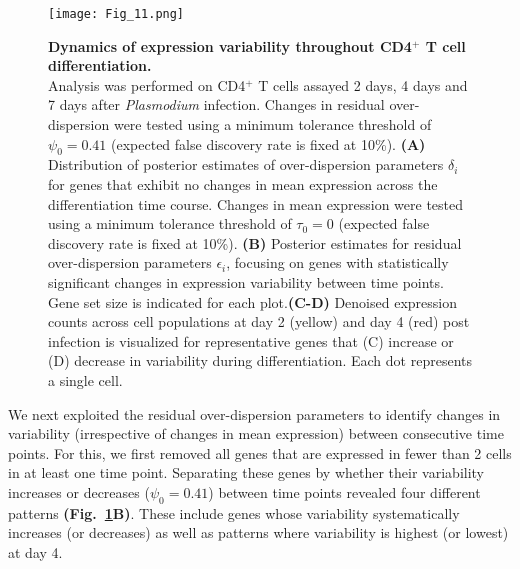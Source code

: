 \begin{figure}[!h]
\centering
\texttt{[image: Fig\_11.png]}
\caption[Dynamics of expression variability throughout CD4$^+$ T cell differentiation]{\textbf{Dynamics of expression variability throughout CD4$^+$ T cell differentiation.}\\
Analysis was performed on CD4$^+$ T cells assayed 2 days, 4 days and 7 days after \textit{Plasmodium} infection. Changes in residual over-dispersion were tested using a minimum tolerance threshold of $\psi_0=0.41$ (expected false discovery rate is fixed at 10\%). \textbf{(A)} Distribution of posterior estimates of over-dispersion parameters $\delta_i$ for genes that exhibit no changes in mean expression across the differentiation time course. Changes in mean expression were tested using a minimum tolerance threshold of $\tau_0=0$ (expected false discovery rate is fixed at 10\%). \textbf{(B)} Posterior estimates for residual over-dispersion parameters  $\epsilon_i$, focusing on genes with statistically significant changes in expression variability between time points. Gene set size is indicated for each plot.\textbf{(C-D)} Denoised expression counts across cell populations at day 2 (yellow) and day 4 (red) post infection is visualized for representative genes that (C) increase or (D) decrease in variability during differentiation. Each dot represents a single cell.\\}
\label{fig2:immune_differentiation}
\end{figure}

We next exploited the residual over-dispersion parameters to identify changes in variability (irrespective of changes in mean expression) between consecutive time points. For this, we first removed all genes that are expressed in fewer than 2 cells in at least one time point. Separating these genes by whether their variability increases or decreases ($\psi_0 = 0.41$) between time points revealed four different patterns \textbf{(Fig.~\ref{fig2:immune_differentiation}B)}. These include genes whose variability systematically increases (or decreases) as well as patterns where variability is highest (or lowest) at day 4. \\

